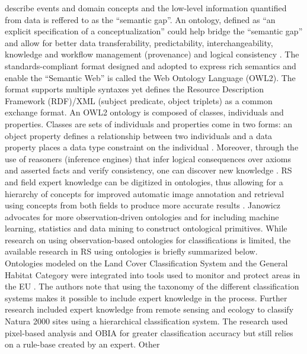 \documentclass[authoryear, review,12pt,number]{elsarticle}
\begin{document}
describe events and domain concepts and the low-level information quantified 
from data is reffered to as the ``semantic gap''.
An ontology, defined as ``an explicit specification of a conceptualization''
\citep{gruber1993} could help bridge the ``semantic gap'' and allow for
better data transferability, predictability, interchangeability, knowledge
and workflow management (provenance) and logical 
consistency \citep{Janowicz2012}.
The standards-compliant format designed and adopted to express rich semantics 
and enable the ``Semantic Web'' is called the Web Ontology Language (OWL2). 
The format supports multiple syntaxes yet defines the Resource 
Description Framework (RDF)/XML (subject predicate, object triplets) as a 
common exchange format. An OWL2 ontology is composed of classes, individuals 
and properties. Classes are sets of individuals and properties come in 
two forms: an object property defines a relationship between two individuals 
and a data property  places a data type constraint on the 
individual \citep{OWL2}.
Moreover, through the use of reasoners (inference engines) 
that infer logical consequences over axioms and asserted facts and verify 
consistency, one can discover new knowledge \citep{Arvor2013, Andres2013a}. RS 
and field expert knowledge can 
be digitized in ontologies, thus allowing for a hierarchy of concepts for 
improved automatic image annotation and retrieval using concepts from both 
fields to produce more accurate results 
\cite{Srikanth:2005:EOA:1076034.1076128}. Janowicz \citep{Janowicz2012} 
advocates for more observation-driven ontologies and for including machine 
learning, 
statistics and data mining to construct ontological primitives. While research 
on using observation-based ontologies for classifications is limited, the 
available research in RS using ontologies is briefly summarized below. \\
Ontologies modeled on the Land Cover Classification
System and the General Habitat Category were integrated into tools used to 
monitor and protect areas in the EU \citep{Arvor2013}. The authors note 
that using the taxonomy of the different classification systems
makes it possible to include expert knowledge in the process. 
Further research included expert knowledge from remote sensing and ecology to 
classify Natura 2000 sites using a hierarchical classification system. The 
research used pixel-based analysis and OBIA for greater classification accuracy 
but still relies on a rule-base created by an expert\citep{Lucas2015}. Other 
\end{document}
